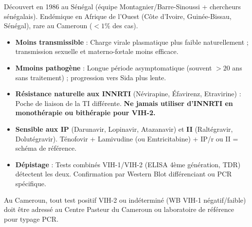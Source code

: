 \documentclass[11pt]{article}
\begin{document}
\begin{savaistu}
Découvert en 1986 au Sénégal (équipe Montagnier/Barre-Sinoussi + chercheurs sénégalais). Endémique en Afrique de l'Ouest (Côte d'Ivoire, Guinée-Bissau, Sénégal), rare au Cameroun ($<1\%$ des cas).
\begin{itemize}
    \item \textbf{Moins transmissible} : Charge virale plasmatique plus faible naturellement ; transmission sexuelle et materno-fœtale moins efficace.
    \item \textbf{Mmoins pathogène} : Longue période asymptomatique (souvent $>20$ ans sans traitement) ; progression vers Sida plus lente.
    \item \textbf{Résistance naturelle aux INNRTI} (Névirapine, Éfavirenz, Etravirine) : Poche de liaison de la TI différente. \textbf{Ne jamais utiliser d'INNRTI en monothérapie ou bithérapie pour VIH-2.}
    \item \textbf{Sensible aux IP} (Darunavir, Lopinavir, Atazanavir) et \textbf{II} (Raltégravir, Dolutégravir). Ténofovir + Lamivudine (ou Emtricitabine) + IP/r ou II = schéma de référence.
    \item \textbf{Dépistage} : Tests combinés VIH-1/VIH-2 (ELISA 4ème génération, TDR) détectent les deux. Confirmation par Western Blot différenciant ou PCR spécifique.
\end{itemize}
Au Cameroun, tout test positif VIH-2 ou indéterminé (WB VIH-1 négatif/faible) doit être adressé au Centre Pasteur du Cameroun ou laboratoire de référence pour typage PCR.
\end{savaistu}
\end{document}
